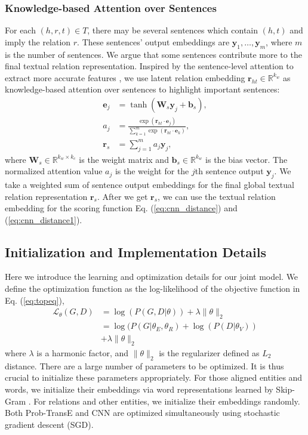 \documentclass[11pt,a4paper]{article}
\begin{document}
\subsubsection{Knowledge-based Attention over Sentences}
For each $(h, r, t) \in T$, there may be several sentences which contain $(h, t)$ and imply the relation $r$. These sentences' output embeddings are ${\mathbf{y}_1, \ldots , \mathbf{y}_m}$, where $m$ is the number of sentences. We argue that some sentences contribute more to the final textual relation representation. Inspired by the sentence-level attention to extract more accurate features \cite{lin2016neural}, we use latent relation embedding $\mathbf{r}_{ht} \in \mathbb{R}^{k_w} $ as knowledge-based attention over sentences to highlight important sentences:
\begin{align}
\mathbf{e}_j & = \tanh(\mathbf{W}_s\mathbf{y}_j+\mathbf{b}_s), \\\nonumber
a_j & =\frac{\exp(\mathbf{r}_{ht}\cdot\mathbf{e}_j)}{\sum_{k = 1}^{m} \exp(\mathbf{r}_{ht}\cdot\mathbf{e}_k)}, \\\nonumber
\mathbf{r}_s & = \sum_{j = 1}^{m} a_j\mathbf{y}_j,
\end{align}
where $\mathbf{W}_s \in \mathbb{R}^{k_w \times k_c}$ is the weight matrix and $\mathbf{b}_s \in \mathbb{R}^{k_w}$ is the bias vector. The normalized attention value $a_j$ is the weight for the $j$th sentence output $\mathbf{y}_j$. We take a weighted sum of sentence output embeddings for the final global textual relation representation $\mathbf{r}_s$. After we get $\mathbf{r}_s$, we can use the textual relation embedding for the scoring function Eq. (\ref{eq:cnn_distance}) and (\ref{eq:cnn_distance1}).

\subsection{Initialization and Implementation Details}
\label{sec:detail}
Here we introduce the learning and optimization details for our joint model. We define the optimization function as the log-likelihood of the objective function in Eq. (\ref{eq:topeq}),
\begin{align}
\mathcal{L}_{\theta}(G, D) & = \log(P(G,D|{\theta})) + \lambda \lVert \theta \rVert_2 \\\nonumber
 & = \log(P(G|{\theta_E, \theta_R}) + \log(P(D|{\theta_V})) \\\nonumber
 & + \lambda \lVert \theta \rVert_2
\end{align}
where $\lambda$ is a harmonic factor, and $\lVert \theta \rVert_2$ is the regularizer defined as $L_2$ distance. There are a large number of parameters to be optimized. It is thus crucial to initialize these parameters appropriately. For those aligned entities and words, we initialize their embeddings via word representations learned by Skip-Gram \cite{mikolov2013efficient}. For relations and other entities, we initialize their embeddings randomly. Both Prob-TransE and CNN are optimized simultaneously using stochastic gradient descent (SGD). 
\end{document}
